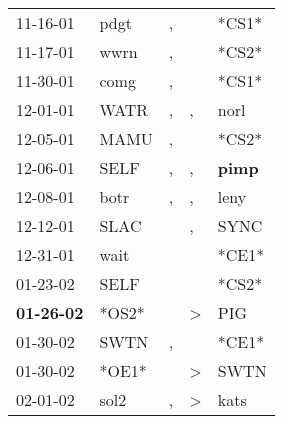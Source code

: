 \begin{supertabular}{p{0.07\textwidth}p{0.06\textwidth}p{0.02\textwidth}p{0.02\textwidth}p{0.06\textwidth}}
          11-16-01\textsuperscript{} &           pdgt\textsuperscript{} &                , &                  &                            *CS1* \\
          11-17-01\textsuperscript{} &           wwrn\textsuperscript{} &                , &                  &                            *CS2* \\
          11-30-01\textsuperscript{} &           comg\textsuperscript{} &                , &                  &                            *CS1* \\
          12-01-01\textsuperscript{} &           WATR\textsuperscript{} &                , &                , &           norl\textsuperscript{} \\
          12-05-01\textsuperscript{} &           MAMU\textsuperscript{} &                , &                  &                            *CS2* \\
          12-06-01\textsuperscript{} &           SELF\textsuperscript{} &                , &                , &  \textbf{pimp\textsuperscript{}} \\
          12-08-01\textsuperscript{} &           botr\textsuperscript{} &                , &                , &           leny\textsuperscript{} \\
          12-12-01\textsuperscript{} &           SLAC\textsuperscript{} &                  &                , &           SYNC\textsuperscript{} \\
          12-31-01\textsuperscript{} &           wait\textsuperscript{} &                  &                  &                            *CE1* \\
          01-23-02\textsuperscript{} &           SELF\textsuperscript{} &                  &                  &                            *CS2* \\
 \textbf{01-26-02\textsuperscript{}} &                            *OS2* &                  &     \textgreater &            PIG\textsuperscript{} \\
          01-30-02\textsuperscript{} &           SWTN\textsuperscript{} &                , &                  &                            *CE1* \\
          01-30-02\textsuperscript{} &                            *OE1* &                  &     \textgreater &           SWTN\textsuperscript{} \\
          02-01-02\textsuperscript{} &           sol2\textsuperscript{} &                , &     \textgreater &           kats\textsuperscript{} \\

\end{supertabular}
